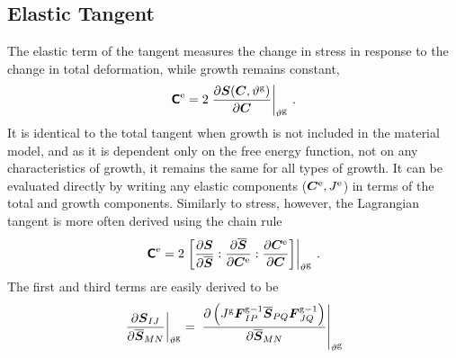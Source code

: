 \documentclass[10pt,letterpaper,oneside]{report}
\newcommand{\ten}[1]{\mbox{\boldmath $#1$}{}}
\newcommand{\tenf}[1]{\mbox{{\sffamily{\bfseries {#1}}}}}
\newcommand{\scas}[1]{\mbox{{\scriptsize{${\rm{#1}}$}}}{}}
\begin{document}
\begin{itemize}
\subsection{Elastic Tangent} 
The elastic term of the tangent measures the change in stress in response to the change in total deformation, while growth remains constant, 
\begin{equation}
\tenf{C}^{\scas{e}} = 2 \left. \frac{ \partial \ten{S} ( \ten{C}, \vartheta^{\scas{g}}) }{ \partial \ten{C} } \right|_{\vartheta^{\scas{g}}} \, . 
\end{equation}
It is identical to the total tangent when growth is not included in the material model, and as it is dependent only on the free energy function, not on any characteristics of growth, it remains the same for all types of growth.  
It can be evaluated directly by writing any elastic components ($\ten{C}^{\scas{e}}, J^{\scas{e}}$) in terms of the total and growth components.  Similarly to stress, however, the Lagrangian tangent is more often derived using the chain rule
\begin{equation}
\tenf{C}^{\scas{e}} = 2 \left. \left[ \frac{ \partial \ten{S} }{ \partial \overline{\ten{S}} } : \frac{ \partial \overline{\ten{S}} }{ \partial \ten{C}^{\scas{e}} } : \frac{ \partial \ten{C}^{\scas{e} } }{ \partial \ten{C} } \right] \right|_{\vartheta^{\scas{g}}} \, .
\end{equation}
The first and third terms are easily derived to be
\begin{align}
\left. \frac{ \partial \ten{S}_{IJ} }{ \partial \overline{\ten{S}}_{MN} } \right|_{\vartheta^{\scas{g}}} 
={}& \left. \frac{ \partial \left( J^{\scas{g}} \ten{F}^{\scas{g}-1}_{IP} \overline{\ten{S}}_{PQ} \ten{F}^{\scas{g}-1}_{JQ} \right) }{ \partial \overline{\ten{S}}_{MN} } \right|_{\vartheta^{\scas{g}}}  
\\

\end{align}
\end{itemize}
\end{document}
